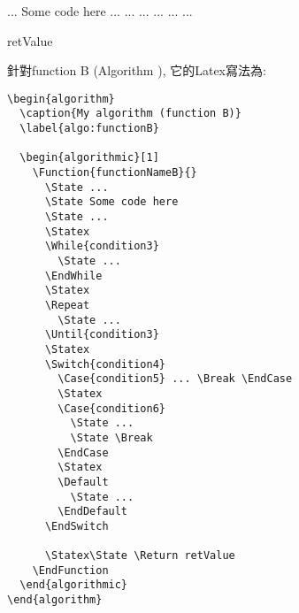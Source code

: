 
\newpage
\begin{algorithm}
  \caption{My algorithm (function B)}
  \label{algo:functionB}

  \begin{algorithmic}[1]
      \State ...
      \State Some code here
      \State ...
      \Statex
        \State ...
      \EndWhile
      \Statex
      \Repeat
        \State ...
      \Statex
         ... \Break \EndCase
        \Statex
          \State ...
          \State \Break
        \EndCase
        \Statex
        \Default
          \State ...
        \EndDefault
      \EndSwitch

      \Statex\State \Return retValue
    \EndFunction
  \end{algorithmic}
\end{algorithm}

\newpage
針對function B (Algorithm ), 它的Latex寫法為:
\begin{framed}
  \begin{verbatim}
\begin{algorithm}
  \caption{My algorithm (function B)}
  \label{algo:functionB}

  \begin{algorithmic}[1]
    \Function{functionNameB}{}
      \State ...
      \State Some code here
      \State ...
      \Statex
      \While{condition3}
        \State ...
      \EndWhile
      \Statex
      \Repeat
        \State ...
      \Until{condition3}
      \Statex
      \Switch{condition4}
        \Case{condition5} ... \Break \EndCase
        \Statex
        \Case{condition6}
          \State ...
          \State \Break
        \EndCase
        \Statex
        \Default
          \State ...
        \EndDefault
      \EndSwitch

      \Statex\State \Return retValue
    \EndFunction
  \end{algorithmic}
\end{algorithm}
  \end{verbatim}
\end{framed}
